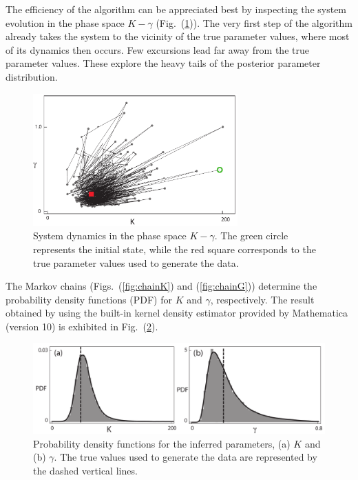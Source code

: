 \documentclass[11pt]{article}
\theoremstyle{definition}
\begin{document}
%
The efficiency of the algorithm can be appreciated best by inspecting the system evolution in the phase space $K-\gamma$ (Fig.~(\ref{fig:phase_space_evol})). The very first step of the algorithm already takes the system to the vicinity of the true parameter values, where most of its dynamics then occurs. Few excursions lead far away from the true parameter values. These explore the heavy tails of the posterior parameter distribution.
\begin{figure}[htb!]
    \centering
    \includegraphics[width=0.7\textwidth]{Fig6.pdf}
    \caption{System dynamics in the phase space $K-\gamma$. The green circle represents the initial state, while the red square corresponds to the true parameter values used to generate the data.}
    \label{fig:phase_space_evol}
\end{figure}

The Markov chains (Figs.~(\ref{fig:chainK}) and (\ref{fig:chainG})) determine the probability density functions (PDF) for $K$ and $\gamma$, respectively. The result obtained by using the built-in kernel density estimator provided by Mathematica (version 10) is exhibited in  Fig.~(\ref{fig:KG_distr}).

\begin{figure}[htb!]
    \centering
    \includegraphics[width=1.0\textwidth]{Fig77.pdf}
    \caption{Probability density functions for the inferred parameters, (a) $K$ and  (b) $\gamma$. The true values used to generate the data are represented by the dashed vertical lines.}
    \label{fig:KG_distr}
\end{figure}
\end{document}
